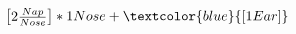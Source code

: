 \documentclass[preview]{standalone}
\begin{document}
\begin{align*}
\begin{bmatrix} 2 \frac{Nap}{Nose} \end{bmatrix} * 1 Nose + \textcolor{blue}{[1 Ear]}
\end{align*}
\end{document}
